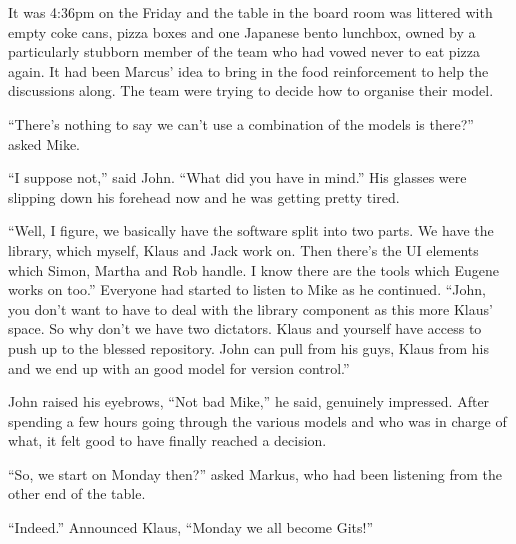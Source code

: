 \begin{trenches}
It was 4:36pm on the Friday and the table in the board room was littered with empty coke cans, pizza boxes and one Japanese bento lunchbox, owned by a particularly stubborn member of the team who had vowed never to eat pizza again.  It had been Marcus' idea to bring in the food reinforcement to help the discussions along.  The team were trying to decide how to organise their model.

``There's nothing to say we can't use a combination of the models is there?'' asked Mike.

``I suppose not,'' said John.  ``What did you have in mind.''  His glasses were slipping down his forehead now and he was getting pretty tired.

``Well, I figure, we basically have the software split into two parts.  We have the library, which myself, Klaus and Jack work on.  Then there's the UI elements which Simon, Martha and Rob handle.  I know there are the tools which Eugene works on too.''  Everyone had started to listen to Mike as he continued.  ``John, you don't want to have to deal with the library component as this more Klaus' space.  So why don't we have two dictators.  Klaus and yourself have access to push up to the blessed repository.  John can pull from his guys, Klaus from his and we end up with an good model for version control.''

John raised his eyebrows, ``Not bad Mike,'' he said, genuinely impressed.  After spending a few hours going through the various models and who was  in charge of what, it felt good to have finally reached a decision.

``So, we start on Monday then?'' asked Markus, who had been listening from the other end of the table.  

``Indeed.''  Announced Klaus, ``Monday we all become Gits!''
\end{trenches}
